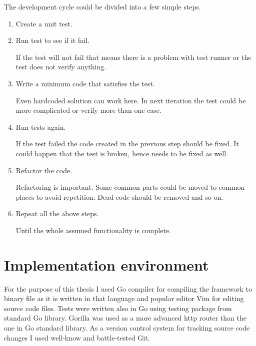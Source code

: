 The development cycle could be divided into a few simple steps.
\begin{enumerate}
    \item Create a unit test.
    \item Run test to see if it fail.

        If the test will not fail that means there is a problem with test
        runner or the test does not verify anything.
    \item Write a minimum code that satisfies the test.

        Even hardcoded solution can work here. In next iteration the test could
        be more complicated or verify more than one case.
    \item Run tests again.

        If the test failed the code created in the previous step should be
        fixed. It could happen that the test is broken, hence needs to be fixed
        as well.
    \item Refactor the code.

        Refactoring is important. Some common parts could be moved to common
        places to avoid repetition. Dead code should be removed and so on.
    \item Repeat all the above steps.

        Until the whole assumed functionality is complete.
\end{enumerate}


\section{Implementation environment}
For the purpose of this thesis I used Go compiler for compiling the framework
to binary file as it is written in that language and popular editor Vim for
editing source code files. Tests were written also in Go using testing package
from standard Go library. Gorilla was used as a more advanced http router than
the one in Go standard library. As a version control system for tracking source
code changes I used well-know and battle-tested Git.
